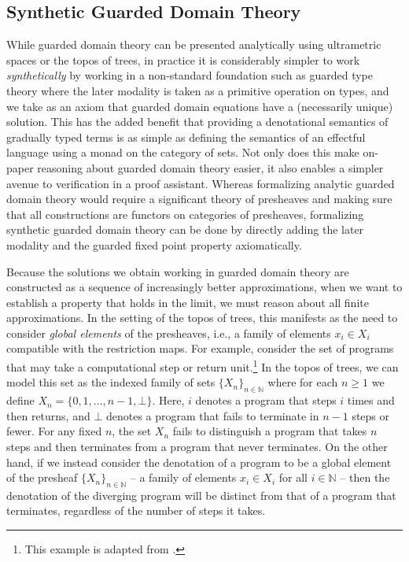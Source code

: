 
\subsection{Synthetic Guarded Domain Theory}

While guarded domain theory can be presented analytically using
ultrametric spaces or the topos of trees, in practice it is
considerably simpler to work \emph{synthetically} by working in a
non-standard foundation such as guarded type theory where the later
modality is taken as a primitive operation on types, and we take as an
axiom that guarded domain equations have a (necessarily unique)
solution. This has the added benefit that providing a denotational
semantics of gradually typed terms is as simple as defining the semantics of an
effectful language using a monad on the category of sets. Not only
does this make on-paper reasoning about guarded domain theory easier,
it also enables a simpler avenue to verification in a proof
assistant. Whereas formalizing analytic guarded domain theory would
require a significant theory of presheaves and making sure that all
constructions are functors on categories of presheaves, formalizing
synthetic guarded domain theory can be done by directly adding the
later modality and the guarded fixed point property axiomatically.
%

Because the solutions we obtain working in guarded domain theory are constructed
as a sequence of increasingly better approximations, when we want to establish a
property that holds in the limit, we must reason about all finite
approximations. In the setting of the topos of trees, this manifests as the need
to consider \emph{global elements} of the presheaves, i.e., a family of elements
$x_i \in X_i$ compatible with the restriction maps. For example, consider the
set of programs that may take a computational step or return unit.\footnote{This example is adapted from \cite{mogelberg-paviotti2016}.} In the
topos of trees, we can model this set as the indexed family of sets $\{X_n\}_{n \in \mathbb{N}}$
where for each $n \ge 1$ we define $X_n = \{0,1,\dots,n-1, \bot\}$. Here, $i$ denotes a program that steps
$i$ times and then returns, and $\bot$ denotes a program that fails to terminate
in $n-1$ steps or fewer. For any fixed $n$, the set $X_n$ fails to distinguish a
program that takes $n$ steps and then terminates from a program that never
terminates. On the other hand, if we instead consider the denotation of a
program to be a global element of the presheaf $\{X_n\}_{n \in \mathbb{N}}$ -- a family of elements
$x_i \in X_i$ for all $i \in \mathbb{N}$ -- then the denotation of the diverging
program will be distinct from that of a program that terminates, regardless of
the number of steps it takes.

